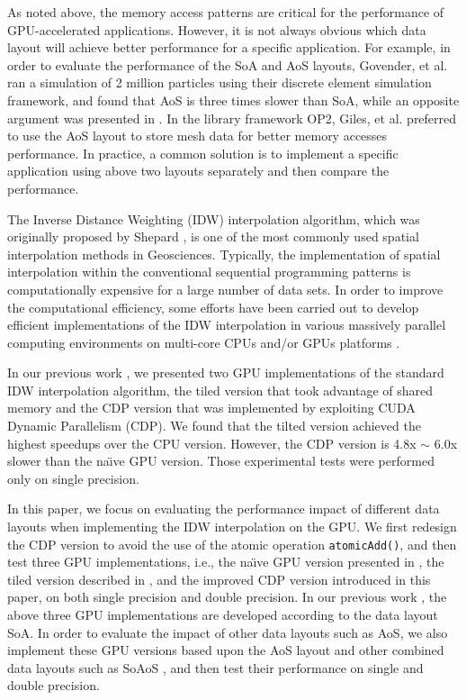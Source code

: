 As noted above, the memory access patterns are critical 
for the performance of GPU-accelerated applications. However, it is not 
always obvious which data layout will achieve better performance for a 
specific application. For example, in order to evaluate the performance of 
the SoA and AoS layouts, Govender, et al. \cite{govender2013}  ran a 
simulation of 2 million particles using their discrete element simulation 
framework, and found that AoS is three times slower than SoA, while an 
opposite argument was presented in \cite{giles2013}. In the library 
framework OP2, Giles, et al. \cite{giles2013} preferred to use the AoS 
layout to store mesh data for better memory accesses performance. In 
practice, a common solution is to implement a specific application using 
above two layouts separately and then compare the performance. 

The Inverse Distance Weighting (IDW) interpolation algorithm, which was 
originally proposed by Shepard \cite{shepard1968}, is one of the most commonly used 
spatial interpolation methods in Geosciences. Typically, the implementation 
of spatial interpolation within the conventional sequential programming 
patterns is computationally expensive for a large number of data sets. In 
order to improve the computational efficiency, some efforts have been 
carried out to develop efficient implementations of the IDW interpolation in 
various massively parallel computing environments on multi-core CPUs 
\cite{armstrong1997,guan2010,huang2011} and/or GPUs platforms \cite{hanzer2012,hennebohl2011,huraj2010,xia2011}.

In our previous work \cite{mei2014}, we presented two GPU implementations of the 
standard IDW interpolation algorithm, the tiled version that took advantage of shared 
memory and the CDP version that was implemented by exploiting CUDA Dynamic 
Parallelism (CDP). We found that the tilted version achieved the highest speedups 
over the CPU version. However, the CDP version is 4.8x $\sim $ 6.0x slower 
than the na\"{\i}ve GPU version. Those experimental tests were 
performed only on single precision.

In this paper, we focus on evaluating the performance impact of different 
data layouts when implementing the IDW interpolation on the GPU. We first 
redesign the CDP version to avoid the use of the atomic operation 
\texttt{atomicAdd()}, and then test three GPU implementations, i.e., the na\"{\i}ve 
GPU version presented in \cite{huraj2010}, the tiled version described in \cite{mei2014}, and 
the improved CDP version introduced in this paper, on both single precision 
and double precision. In our previous work \cite{mei2014}, the above three GPU 
implementations are developed according to the data layout SoA. In order to 
evaluate the impact of other data layouts such as AoS, we also implement 
these GPU versions based upon the AoS layout and other combined data layouts 
such as SoAoS \cite{siegel2009}, and then test their performance on single and double 
precision.

